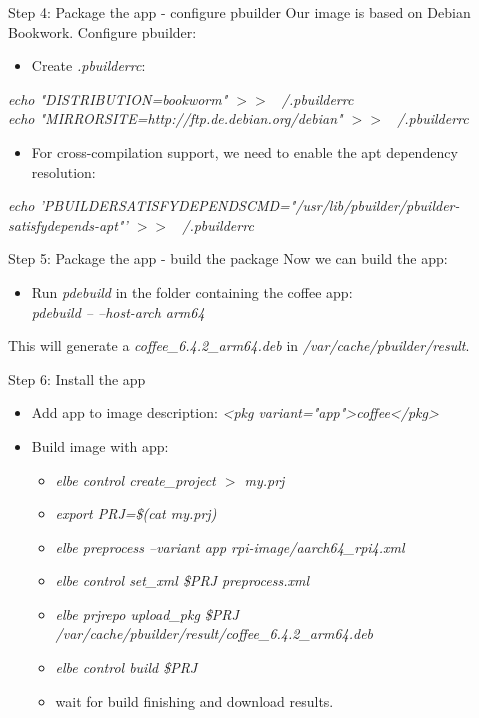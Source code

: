\documentclass{beamer}
\begin{document}
\begin{frame}{Step 4: Package the app - configure pbuilder}
	Our image is based on Debian Bookwork. Configure pbuilder:
	\begin{itemize}
		\item Create \emph{.pbuilderrc}:
	\end{itemize}
	
	\small{\emph{echo "DISTRIBUTION=bookworm" $>>$ ~/.pbuilderrc} \\
	\emph{echo "MIRRORSITE=http://ftp.de.debian.org/debian" $>>$ ~/.pbuilderrc}}
	
	\begin{itemize}
		\item For cross-compilation support, we need to enable the apt dependency resolution:
	\end{itemize}
	\small{\emph{echo 'PBUILDERSATISFYDEPENDSCMD="/usr/lib/pbuilder/pbuilder-satisfydepends-apt"' $>>$ ~/.pbuilderrc}}
\end{frame}

\begin{frame}{Step 5: Package the app - build the package}
	Now we can build the app:
	\begin{itemize}
		\item Run \emph{pdebuild} in the folder containing the coffee app: \\ \emph{pdebuild -- --host-arch arm64}
	\end{itemize}
	This will generate a \emph{coffee\_6.4.2\_arm64.deb} in \emph{/var/cache/pbuilder/result}.
\end{frame}

\begin{frame}{Step 6: Install the app}
	\begin{itemize}
		\item Add app to image description: \emph{<pkg variant="app">coffee</pkg>}
		\item Build image with app:
		\small{\begin{itemize}
			\item \emph{elbe control create\_project $>$ my.prj}
			\item \emph{export PRJ=\$(cat my.prj)}
			\item \emph{elbe preprocess --variant app rpi-image/aarch64\_rpi4.xml}
			\item \emph{elbe control set\_xml \$PRJ preprocess.xml}
			\item \emph{elbe prjrepo upload\_pkg \$PRJ /var/cache/pbuilder/result/coffee\_6.4.2\_arm64.deb}
			\item \emph{elbe control build \$PRJ}
			\item wait for build finishing and download results.
		\end{itemize}}
	\end{itemize}
\end{frame}
\end{document}
